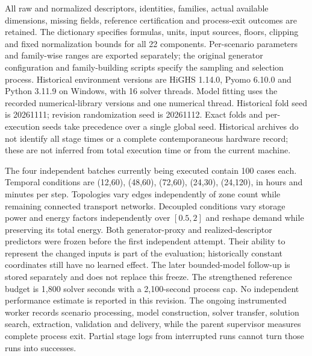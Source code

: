 All raw and normalized
descriptors, identities, families, actual available dimensions, missing
fields, reference certification and process-exit outcomes are retained.
The dictionary specifies formulas, units, input sources, floors, clipping
and fixed normalization bounds for all 22 components. Per-scenario
parameters and family-wise ranges are exported separately; the original
generator configuration and family-building scripts specify the sampling
and selection process. Historical environment versions are HiGHS 1.14.0,
Pyomo 6.10.0 and Python 3.11.9 on Windows, with 16 solver threads. Model
fitting uses the recorded numerical-library versions and one numerical
thread. Historical fold seed is 20261111; revision randomization seed is
20261112. Exact folds and per-execution seeds take precedence over a single
global seed. Historical archives do not identify all stage times or a
complete contemporaneous hardware record; these are not inferred from
total execution time or from the current machine.

The four independent batches currently being executed contain 100 cases each. Temporal
conditions are (12,60), (48,60), (72,60), (24,30), (24,120), in hours and
minutes per step. Topologies vary edges independently of zone count while
remaining connected transport networks. Decoupled conditions vary storage
power and energy factors independently over $[0.5,2]$ and reshape demand
while preserving its total energy. Both generator-proxy and realized-descriptor
predictors were frozen before the first independent attempt. Their ability
to represent the changed inputs is part of the evaluation; historically
constant coordinates still have no learned effect. The later bounded-model
follow-up is stored separately and does not replace this freeze. The strengthened
reference budget is 1,800 solver seconds with a 2,100-second process cap.
No independent performance estimate is reported in this revision. The ongoing
instrumented worker records scenario processing, model construction,
solver transfer, solution search, extraction, validation and delivery,
while the parent supervisor measures complete process exit. Partial stage
logs from interrupted runs cannot turn those runs into successes.
